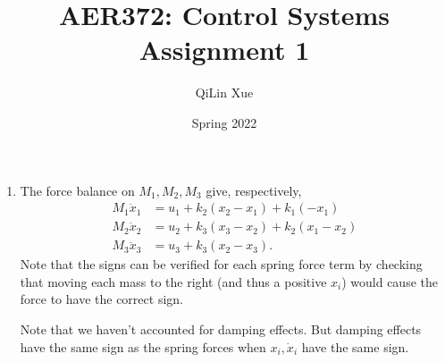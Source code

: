 \documentclass{article}
\title{AER372: Control Systems  \\ Assignment 1}
\author{QiLin Xue}
\date{Spring 2022}
\numberwithin{equation}{section}
\begin{document}
\maketitle
\begin{enumerate}[label=\textbf{1.\arabic*}]
    \item The force balance on $M_1,M_2,M_3$ give, respectively,
    \begin{align}
        M_1\ddot{x}_1 &= u_1 + k_2(x_2-x_1) + k_1(-x_1) \\ 
        M_2\ddot{x}_2 &= u_2 + k_3(x_3-x_2) + k_2(x_1-x_2) \\ 
        M_3\ddot{x}_3 &= u_3 + k_3(x_2-x_3).
    \end{align}
    Note that the signs can be verified for each spring force term by checking that moving each mass to the right (and thus a positive $x_i$) would cause the force to have the correct sign.
    
    Note that we haven't accounted for damping effects. But damping effects have the same sign as the spring forces when $x_i,\dot{x}_i$ have the same sign.
    

\end{enumerate}
\end{document}
